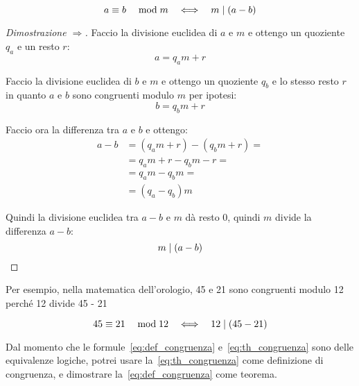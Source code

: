 \begin{mdframed}
    \begin{teorema}
        \label{th:congruenza}
        \begin{equation}
            \label{eq:th_congruenza}  a \equiv b \quad\bmod m   \quad\Longleftrightarrow\quad  m  \mid  (a - b)
        \end{equation}
    \end{teorema}
    \begin{proof}[Dimostrazione $\Longrightarrow$]
        Faccio la divisione euclidea di $a$ e $m$ e ottengo un quoziente $q_a$ e un resto $r$:
        \begin{equation*}
            a = q_a m + r
        \end{equation*}

        Faccio la divisione euclidea di $b$ e $m$ e ottengo un quoziente $q_b$ e lo stesso resto $r$ in quanto $a$ e $b$ sono congruenti modulo $m$ per ipotesi:
        \begin{equation*}
            b = q_b m + r
        \end{equation*}

        Faccio ora la differenza tra $a$ e $b$ e ottengo:
        \begin{align*}
            a - b &= (q_a m + r) - (q_b m + r) = \\
            &= q_a m + r - q_b m - r = \\
            &= q_a m - q_b m = \\
            &= (q_a - q_b)m
        \end{align*}

        Quindi la divisione euclidea tra $a - b$ e $m$ dà resto 0, quindi $m$ divide la differenza $a - b$:
        \begin{equation*}
            m  \mid  (a - b)
        \end{equation*}
    \end{proof}
\end{mdframed}

Per esempio, nella matematica dell'orologio, 45 e 21 sono congruenti modulo 12 perché 12 divide 45 - 21

\begin{equation*}
     45 \equiv 21 \quad\bmod 12   \quad\Longleftrightarrow\quad  12  \mid  (45 - 21)
\end{equation*}

Dal momento che le formule~\eqref{eq:def_congruenza} e~\eqref{eq:th_congruenza} sono delle equivalenze logiche, potrei usare la~\eqref{eq:th_congruenza} come definizione di congruenza, e dimostrare la~\eqref{eq:def_congruenza} come teorema.

